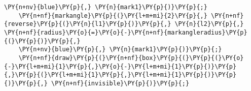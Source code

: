 \begin{Verbatim}[commandchars=\\\{\}]
    \PY{n+nv}{blue}\PY{p}{,} \PY{n}{mark1}\PY{p}{)}\PY{p}{;}
    \PY{n+nf}{markangle}\PY{p}{(}\PY{l+m+mi}{2}\PY{p}{,} \PY{n+nf}{reverse}\PY{p}{(}\PY{n}{l1}\PY{p}{)}\PY{p}{,} \PY{n}{l2}\PY{p}{,} \PY{n+nf}{radius}\PY{o}{=}\PY{o}{-}\PY{n+nf}{markangleradius}\PY{p}{(}\PY{p}{)}\PY{p}{,}
    \PY{n+nv}{blue}\PY{p}{,} \PY{n}{mark1}\PY{p}{)}\PY{p}{;}
    \PY{n+nf}{draw}\PY{p}{(}\PY{n+nf}{box}\PY{p}{(}\PY{p}{(}\PY{o}{-}\PY{l+m+mi}{1}\PY{p}{,}\PY{o}{-}\PY{l+m+mi}{1}\PY{p}{)}\PY{p}{,}\PY{p}{(}\PY{l+m+mi}{1}\PY{p}{,}\PY{l+m+mi}{1}\PY{p}{)}\PY{p}{)}\PY{p}{,} \PY{n+nf}{invisible}\PY{p}{)}\PY{p}{;}
\end{Verbatim}
